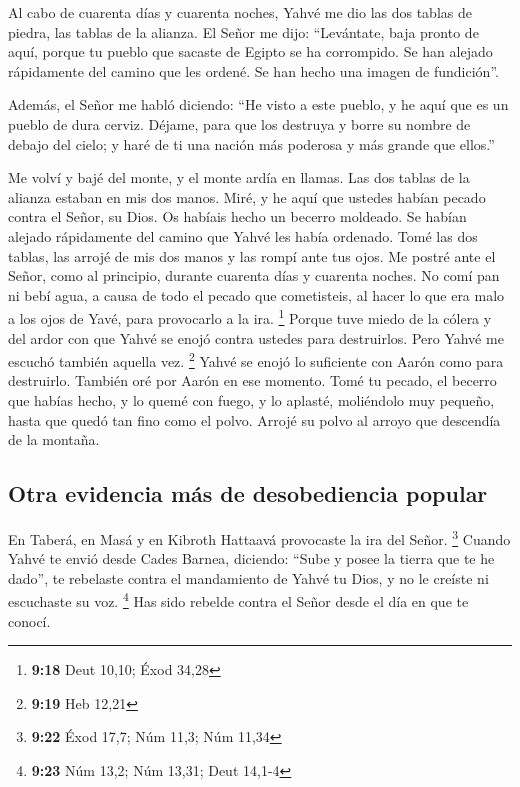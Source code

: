 \begin{paracol}{2}
 Al cabo de cuarenta días y cuarenta noches, Yahvé me dio
las dos tablas de piedra, las tablas de la alianza.  El
Señor me dijo: ``Levántate, baja pronto de aquí, porque tu pueblo que
sacaste de Egipto se ha corrompido. Se han alejado rápidamente del
camino que les ordené. Se han hecho una imagen de fundición''.

 Además, el Señor me habló diciendo: ``He visto a este
pueblo, y he aquí que es un pueblo de dura cerviz. 
Déjame, para que los destruya y borre su nombre de debajo del cielo; y
haré de ti una nación más poderosa y más grande que ellos.''

 Me volví y bajé del monte, y el monte ardía en llamas.
Las dos tablas de la alianza estaban en mis dos manos. 
Miré, y he aquí que ustedes habían pecado contra el Señor, su Dios. Os
habíais hecho un becerro moldeado. Se habían alejado rápidamente del
camino que Yahvé les había ordenado.  Tomé las dos
tablas, las arrojé de mis dos manos y las rompí ante tus ojos.
 Me postré ante el Señor, como al principio, durante
cuarenta días y cuarenta noches. No comí pan ni bebí agua, a causa de
todo el pecado que cometisteis, al hacer lo que era malo a los ojos de
Yavé, para provocarlo a la ira. \footnote{\textbf{9:18} Deut 10,10; Éxod
  34,28}  Porque tuve miedo de la cólera y del ardor con
que Yahvé se enojó contra ustedes para destruirlos. Pero Yahvé me
escuchó también aquella vez. \footnote{\textbf{9:19} Heb 12,21}
 Yahvé se enojó lo suficiente con Aarón como para
destruirlo. También oré por Aarón en ese momento.  Tomé
tu pecado, el becerro que habías hecho, y lo quemé con fuego, y lo
aplasté, moliéndolo muy pequeño, hasta que quedó tan fino como el polvo.
Arrojé su polvo al arroyo que descendía de la montaña.

\hypertarget{otra-evidencia-muxe1s-de-desobediencia-popular}{%
\subsection{Otra evidencia más de desobediencia
popular}\label{otra-evidencia-muxe1s-de-desobediencia-popular}}

 En Taberá, en Masá y en Kibroth Hattaavá provocaste la
ira del Señor. \footnote{\textbf{9:22} Éxod 17,7; Núm 11,3; Núm 11,34}
 Cuando Yahvé te envió desde Cades Barnea, diciendo:
``Sube y posee la tierra que te he dado'', te rebelaste contra el
mandamiento de Yahvé tu Dios, y no le creíste ni escuchaste su voz.
\footnote{\textbf{9:23} Núm 13,2; Núm 13,31; Deut 14,1-4}
 Has sido rebelde contra el Señor desde el día en que te
conocí.


\end{paracol}

